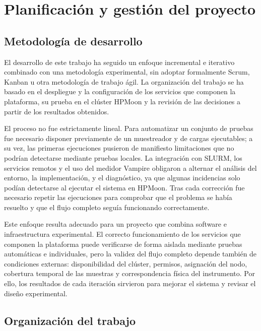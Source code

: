 \chapter{Planificación y gestión del proyecto}
\label{chap:planificacion}

\section{Metodología de desarrollo}
\label{sec:planificacion-metodologia}

El desarrollo de este trabajo ha seguido un enfoque incremental e iterativo combinado con una metodología experimental, sin adoptar formalmente Scrum, Kanban u otra metodología de trabajo ágil. La organización del trabajo se ha basado en el despliegue y la configuración de los servicios que componen la plataforma, su prueba en el clúster HPMoon y la revisión de las decisiones a partir de los resultados obtenidos.

El proceso no fue estrictamente lineal. Para automatizar un conjunto de pruebas fue necesario disponer previamente de un muestreador y de cargas ejecutables; a su vez, las primeras ejecuciones pusieron de manifiesto limitaciones que no podrían detectarse mediante pruebas locales. La integración con SLURM, los servicios remotos y el uso del medidor Vampire obligaron a alternar el análisis del entorno, la implementación, y el diagnóstico, ya que algunas incidencias solo podían detectarse al ejecutar el sistema en HPMoon. Tras cada corrección fue necesario repetir las ejecuciones para comprobar que el problema se había resuelto y que el flujo completo seguía funcionando correctamente.

Este enfoque resulta adecuado para un proyecto que combina software e infraestructura experimental. El correcto funcionamiento de los servicios que componen la plataforma puede verificarse de forma aislada mediante pruebas automáticas e individuales, pero la validez del flujo completo depende también de condiciones externas: disponibilidad del clúster, permisos, asignación del nodo, cobertura temporal de las muestras y correspondencia física del instrumento. Por ello, los resultados de cada iteración sirvieron para mejorar el sistema y revisar el diseño experimental.

\section{Organización del trabajo}
\label{sec:planificacion-fases}

